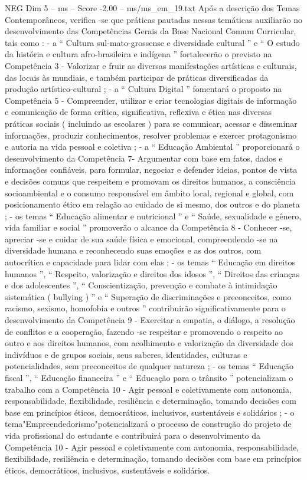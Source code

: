 \begin{textsample}{NEG Dim 5 – ms – Score -2.00 – ms/ms\_em\_19.txt}
Após a descrição dos Temas Contemporâneos, verifica -se que práticas pautadas nessas temáticas auxiliarão no desenvolvimento das Competências Gerais da Base Nacional Comum Curricular, tais como : - a “ Cultura sul-mato-grossense e diversidade cultural ” e “ O estudo da história e cultura afro-brasileira e indígena ” fortalecerão o previsto na Competência 3 - Valorizar e fruir as diversas manifestações artísticas e culturais, das locais às mundiais, e também participar de práticas diversificadas da produção artístico-cultural ; - a “ Cultura Digital ” fomentará o proposto na Competência 5 - Compreender, utilizar e criar tecnologias digitais de informação e comunicação de forma crítica, significativa, reflexiva e ética nas diversas práticas sociais ( incluindo as escolares ) para se comunicar, acessar e disseminar informações, produzir conhecimentos, resolver problemas e exercer protagonismo e autoria na vida pessoal e coletiva ; - a “ Educação Ambiental ” proporcionará o desenvolvimento da Competência 7- Argumentar com base em fatos, dados e informações confiáveis, para formular, negociar e defender ideias, pontos de vista e decisões comuns que respeitem e promovam os direitos humanos, a consciência socioambiental e o consumo responsável em âmbito local, regional e global, com posicionamento ético em relação ao cuidado de si mesmo, dos outros e do planeta ; - os temas “ Educação alimentar e nutricional ” e “ Saúde, sexualidade e gênero, vida familiar e social ” promoverão o alcance da Competência 8 - Conhecer -se, apreciar -se e cuidar de sua saúde física e emocional, compreendendo -se na diversidade humana e reconhecendo suas emoções e as dos outros, com autocrítica e capacidade para lidar com elas ; - os temas “ Educação em direitos humanos ”, “ Respeito, valorização e direitos dos idosos ”, “ Direitos das crianças e dos adolescentes ”, “ Conscientização, prevenção e combate à intimidação sistemática ( bullying ) ” e “ Superação de discriminações e preconceitos, como racismo, sexismo, homofobia e outros ” contribuirão significativamente para o desenvolvimento da Competência 9 - Exercitar a empatia, o diálogo, a resolução de conflitos e a cooperação, fazendo -se respeitar e promovendo o respeito ao outro e aos direitos humanos, com acolhimento e valorização da diversidade dos indivíduos e de grupos sociais, seus saberes, identidades, culturas e potencialidades, sem preconceitos de qualquer natureza ; - os temas “ Educação fiscal ”, “ Educação financeira ” e “ Educação para o trânsito ” potencializam o trabalho com a Competência 10 - Agir pessoal e coletivamente com autonomia, responsabilidade, flexibilidade, resiliência e determinação, tomando decisões com base em princípios éticos, democráticos, inclusivos, sustentáveis e solidários ; - o tema"Empreendedorismo"potencializará o processo de construção do projeto de vida profissional do estudante e contribuirá para o desenvolvimento da Competência 10 - Agir pessoal e coletivamente com autonomia, responsabilidade, flexibilidade, resiliência e determinação, tomando decisões com base em princípios éticos, democráticos, inclusivos, sustentáveis e solidários.

\end{textsample}
